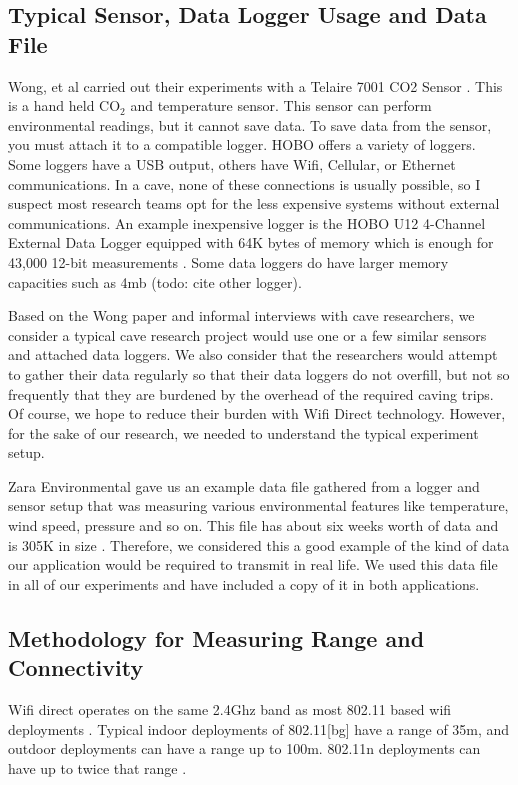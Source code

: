 \documentclass[10pt,twocolumn]{article}
\begin{document}
\subsection{Typical Sensor, Data Logger Usage and Data File}
Wong, et al carried out their experiments with a Telaire 7001 CO2 Sensor \cite{telaire} \cite{wong2010}. 
This is a hand held CO$_2$ and temperature sensor.
This sensor can perform environmental readings, but it cannot save data.
To save data from the sensor, you must attach it to a compatible logger.
HOBO offers a variety of loggers.
Some loggers have a USB output, others have Wifi, Cellular, or Ethernet communications.
In a cave, none of these connections is usually possible, so I suspect most research teams opt for the less expensive systems without external communications.
An example inexpensive logger is the HOBO U12 4-Channel External Data Logger equipped with 64K bytes of memory which is enough for 43,000 12-bit measurements \cite{logger}. 
Some data loggers do have larger memory capacities such as 4mb (todo: cite other logger).

Based on the Wong paper and informal interviews with cave researchers, we consider a typical cave research project would use one or a few similar sensors and attached data loggers.
We also consider that the researchers would attempt to gather their data regularly so that their data loggers do not overfill, but not so frequently that they are burdened by the overhead of the required caving trips.
Of course, we hope to reduce their burden with Wifi Direct technology.
However, for the sake of our research, we needed to understand the typical experiment setup.

Zara Environmental gave us an example data file gathered from a logger and sensor setup that was measuring various environmental features like temperature, wind speed, pressure and so on.
This file has about six weeks worth of data and is 305K in size \cite{datafile}.
Therefore, we considered this a good example of the kind of data our application would be required to transmit in real life.
We used this data file in all of our experiments and have included a copy of it in both applications.

\subsection{Methodology for Measuring Range and Connectivity}
Wifi direct operates on the same 2.4Ghz band as most 802.11 based wifi deployments \cite{wifiwhitepaper}.
Typical indoor deployments of 802.11[bg] have a range of 35m, and outdoor deployments can have a range up to 100m.
802.11n deployments can have up to twice that range \cite{wikiwifi}.
\end{document}
